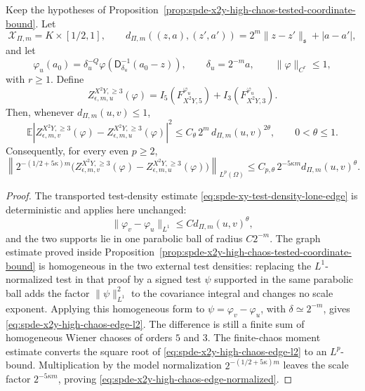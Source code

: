 \begin{proposition}
\label{prop:spde-x2y-high-chaos-tested-coordinate-edge-bound}
Keep the hypotheses of
Proposition~\ref{prop:spde-x2y-high-chaos-tested-coordinate-bound}.  Let
\[
  \mathcal X_{\Pi,m}=K\times[1/2,1],
  \qquad
  d_{\Pi,m}((z,a),(z',a'))=2^m\|z-z'\|_{\mathfrak s}+|a-a'|,
\]
and let
\[
  \varphi_u(a_0)
  =
  \delta_u^{-Q}\varphi(\mathsf D_{\delta_u}^{-1}(a_0-z)),
  \qquad
  \delta_u=2^{-m}a,\qquad
  \|\varphi\|_{C^r}\leq1 ,
\]
with \(r\geq1\).  Define
\[
  Z_{\epsilon,m,u}^{X^2Y,\geq3}(\varphi)
  =
  I_5(F_{X^2Y,5}^{\varphi_u})
  +
  I_3(F_{X^2Y,3}^{\varphi_u}) .
\]
Then, whenever \(d_{\Pi,m}(u,v)\leq1\),
\begin{equation}
  \mathbb E
  \left|
    Z_{\epsilon,m,v}^{X^2Y,\geq3}(\varphi)
    -
    Z_{\epsilon,m,u}^{X^2Y,\geq3}(\varphi)
  \right|^2
  \leq
  C_\theta\,2^m\,d_{\Pi,m}(u,v)^{2\theta},
  \qquad 0<\theta\leq1 .
  \label{eq:spde-x2y-high-chaos-edge-l2}
\end{equation}
Consequently, for every even \(p\geq2\),
\begin{equation}
  \left\|
    2^{-(1/2+5\kappa)m}
    \bigl(
      Z_{\epsilon,m,v}^{X^2Y,\geq3}(\varphi)
      -
      Z_{\epsilon,m,u}^{X^2Y,\geq3}(\varphi)
    \bigr)
  \right\|_{L^p(\Omega)}
  \leq
  C_{p,\theta}\,
  2^{-5\kappa m}d_{\Pi,m}(u,v)^\theta .
  \label{eq:spde-x2y-high-chaos-edge-normalized}
\end{equation}
\end{proposition}

\begin{proof}
The transported test-density estimate
\eqref{eq:spde-xy-test-density-lone-edge} is deterministic and applies here
unchanged:
\[
  \|\varphi_v-\varphi_u\|_{L^1}
  \leq C d_{\Pi,m}(u,v)^\theta ,
\]
and the two supports lie in one parabolic ball of radius \(C2^{-m}\).  The
graph estimate proved inside
Proposition~\ref{prop:spde-x2y-high-chaos-tested-coordinate-bound} is
homogeneous in the two external test densities: replacing the
\(L^1\)-normalized test in that proof by a signed test \(\psi\) supported in
the same parabolic ball adds the factor \(\|\psi\|_{L^1}^2\) to the covariance
integral and changes no scale exponent.  Applying this homogeneous form to
\(\psi=\varphi_v-\varphi_u\), with \(\delta\simeq2^{-m}\), gives
\eqref{eq:spde-x2y-high-chaos-edge-l2}.  The difference is still a finite
sum of homogeneous Wiener chaoses of orders \(5\) and \(3\).  The finite-chaos
moment estimate converts the square root of
\eqref{eq:spde-x2y-high-chaos-edge-l2} to an \(L^p\)-bound.  Multiplication
by the model normalization \(2^{-(1/2+5\kappa)m}\) leaves the scale factor
\(2^{-5\kappa m}\), proving
\eqref{eq:spde-x2y-high-chaos-edge-normalized}.
\end{proof}

